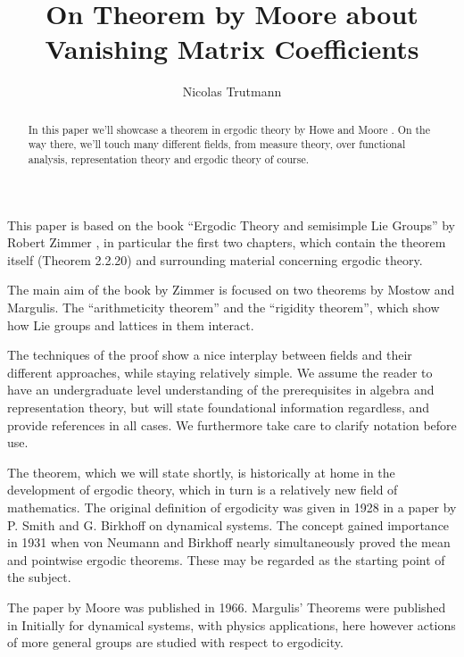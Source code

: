 \documentclass[
]{article}
\title{On Theorem by Moore about Vanishing Matrix Coefficients}
\author{Nicolas Trutmann}
\date{}
\begin{document}
\maketitle

\begin{abstract}
  In this paper we'll showcase a theorem in ergodic theory by Howe and
  Moore \cite{howe79}.
  On the way there, we'll touch many different
  fields, from measure theory, over functional analysis, representation
  theory and ergodic theory of course.
\end{abstract}

\newpage
\tableofcontents
\newpage

This paper is based on the book ``Ergodic Theory and semisimple Lie
Groups'' by Robert Zimmer \cite{Zimmer84}, in particular the first two
chapters, which contain the theorem itself (Theorem 2.2.20) and
surrounding material concerning ergodic theory.

The main aim of the book by Zimmer is focused on two
theorems by Mostow and Margulis. The ``arithmeticity theorem'' and the
``rigidity theorem'', which show how Lie groups and lattices in them
interact.

The techniques of the proof show a nice interplay between fields and
their different approaches, while staying relatively simple. We assume
the reader to have an undergraduate level understanding of the
prerequisites in algebra and representation theory, but will state
foundational information regardless, and provide references in all
cases. We furthermore take care to clarify notation before use.

The theorem, which we will state shortly, is historically at home in the
development of ergodic theory, which in turn is a relatively new field
of mathematics. The original definition of ergodicity was given in 1928
in a paper by P. Smith and G. Birkhoff on dynamical systems. The concept
gained importance in 1931 when von Neumann and Birkhoff nearly
simultaneously proved the mean and pointwise ergodic theorems. These may
be regarded as the starting point of the subject.


The paper by Moore \cite{Moore66} was published in 1966. Margulis' Theorems were published in 
Initially for dynamical systems, with physics applications, here
however actions of more general groups are studied with respect to
ergodicity.
\end{document}
